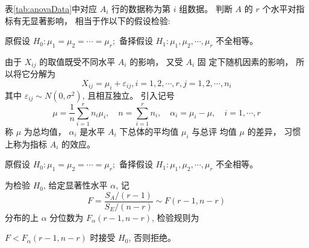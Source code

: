 表\cref{tab:anovaData}中对应 $A_{i}$ 行的数据称为第 $i$ 组数据。 判断 ${A}$ 的 ${r}$ 个水平对指标有无显著影响， 相当于作以下的假设检验:

原假设 $H_{0}: \mu_{1}=\mu_{2}=\cdots=\mu_{r} ;$
备择假设 ${H}_{1}: \mu_{1}, \mu_{2}, \cdots, \mu_{r}$ 不全相等。 

由于 $  X_{i j}  $ 的取值既受不同水平 $  A_{i}  $ 的影响， 又受 $  A_{i}  $ 固 定下随机因素的影响， 所以将它分解为
\begin{equation}
X_{i j}=\mu_{i}+\varepsilon_{i j}, i=1,2, \cdots, r, j=1,2, \cdots, n_{i}\label{eq:anovaDecomposition}
\end{equation}
其中 $  \varepsilon_{i j} \sim N\left({0}, \sigma^{2}\right)  $, 且相互独立。 引入记号
\begin{equation}
\mu=\frac{1}{n} \sum_{i=1}^{r} n_{i} \mu_{i}, \quad n=\sum_{i=1}^{r} n_{i}, \quad \alpha_{i}=\mu_{i}-\mu, \quad i=1, \cdots, r
\end{equation}
称 $  \mu  $ 为总均值， $  \alpha_{i}  $ 是水平 $  A_{i}  $ 下总体的平均值 $  \mu_{i}  $ 与总评
均值 $  \mu  $ 的差异， 习惯上称为指标 $  {A}_{i}  $ 的效应。 

\begin{definition}
原假设 $H_{0}: \mu_{1}=\mu_{2}=\cdots=\mu_{r} ;$
备择假设 ${H}_{1}: \mu_{1}, \mu_{2}, \cdots, \mu_{r}$ 不全相等。 

为检验 $  {H}_{0}  $, 给定显著性水平 $  \alpha  $, 记 \[ {F}=\frac{S_{A} /(r-1)}{S_{E} /(n-r)} \sim F(r-1, n-r) \] 分布的上 $  \alpha  $ 分位数为 $  {F}_{\alpha}({r}-{1}, {n}-{r})  $, 检验规则为

$  {F}<{F}_{\alpha}({r}-{1}, {n}-{r})  $ 时接受 $  {H}_{{0}}  $, 否则拒绝。 
\end{definition}

